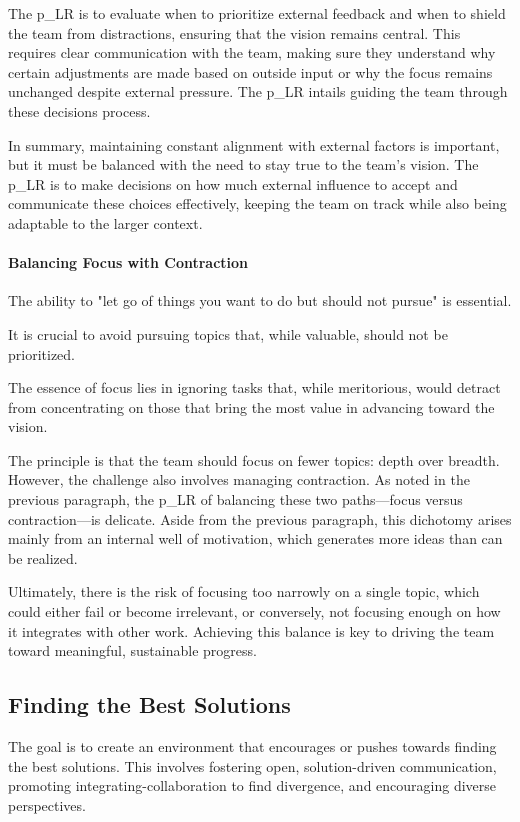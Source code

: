 The \gls{p_LR} is to evaluate when to prioritize external feedback and when to shield the team from distractions, ensuring that the vision remains central. This requires clear communication with the team, making sure they understand why certain adjustments are made based on outside input or why the focus remains unchanged despite external pressure. The \gls{p_LR} intails guiding the team through these decisions process.

In summary, maintaining constant alignment with external factors is important, but it must be balanced with the need to stay true to the team’s vision. The \gls{p_LR} is to make decisions on how much external influence to accept and communicate these choices effectively, keeping the team on track while also being adaptable to the larger context.

\paragraph{Balancing Focus with Contraction}

The ability to "let go of things you want to do but should not pursue" is essential.

It is crucial to avoid pursuing topics that, while valuable, should not be prioritized. \begin{center} The essence of focus lies in ignoring tasks that, while meritorious, would detract from concentrating on those that bring the most value in advancing toward the vision. \end{center}

The principle is that the team should focus on fewer topics: depth over breadth. However, the challenge also involves managing contraction. As noted in the previous paragraph, the \gls{p_LR} of balancing these two paths—focus versus contraction—is delicate. Aside from the previous paragraph, this dichotomy arises mainly from an internal well of motivation, which generates more ideas than can be realized.

Ultimately, there is the risk of focusing too narrowly on a single topic, which could either fail or become irrelevant, or conversely, not focusing enough on how it integrates with other work. Achieving this balance is key to driving the team toward meaningful, sustainable progress.

\subsection{Finding the Best Solutions} \label{responsibility__finding}
The goal is to create an environment that encourages or pushes towards finding the best solutions. This involves fostering open, solution-driven communication, promoting integrating-collaboration to find divergence, and encouraging diverse perspectives.

